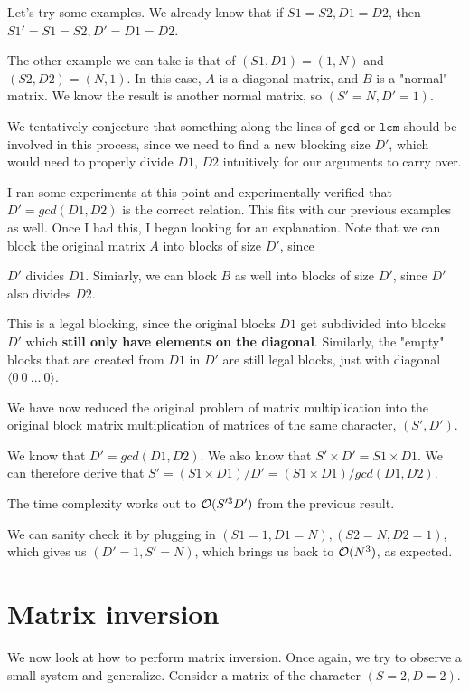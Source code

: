 \documentclass[11pt]{article}
\begin{document}
Let's try some examples. We already know that if $S1 = S2, D1 = D2$, then
$S1' = S1 = S2, D' = D1 = D2$.


The other example we can take is that of $(S1, D1) = (1, N)$ and $(S2, D2) =
(N, 1)$. In this case, $A$ is a diagonal matrix, and $B$ is a "normal" matrix.
We know the result is another normal matrix, so $(S' = N, D' = 1)$.


We tentatively conjecture that something along the lines of $\texttt{gcd}$
or $\texttt{lcm}$ should be involved in this process, since we need to find
a new blocking size $D'$, which would need to properly divide $D1$, $D2$ 
intuitively for our arguments to carry over. 


I ran some experiments at this point and experimentally verified that 
$D' = gcd(D1, D2)$ is the correct relation. This fits with our previous
examples as well. Once I had this, I began looking for an explanation.
Note that we can block the original matrix $A$ into blocks of size $D'$, since

$D'$ divides $D1$.  Simiarly, we can block $B$ as well into blocks of size
$D'$, since $D'$ also divides $D2$.

This is a legal blocking, since the original blocks $D1$ get subdivided into
blocks $D'$ which \textbf{still only have elements on the diagonal}. Similarly,
the "empty" blocks that are created from $D1$ in $D'$ are still legal blocks,
just with diagonal $\langle 0~0~\dots~0 \rangle$.


We have now reduced the original problem of matrix multiplication into the
original block matrix multiplication of matrices of the same character, $(S', D')$.

We know that $D' = gcd(D1, D2)$. We also know that $S' \times D' = S1 \times D1$.
We can therefore derive that $S' = (S1 \times D1) / D' = (S1 \times D1) / gcd(D1, D2)$.

The time complexity works out to $\mathcal{O}(S'^3 D')$ from the previous result.

We can sanity check it by plugging in $(S1 = 1, D1 = N), (S2 = N, D2 = 1)$, which gives us
$(D' = 1, S' = N)$, which brings us back to $\mathcal{O}(N^3)$, as expected.


\section{Matrix inversion}
We now look at how to perform matrix inversion. Once again, we try to observe
a small system and generalize. Consider a matrix of the character $(S = 2, D = 2)$.
\end{document}
